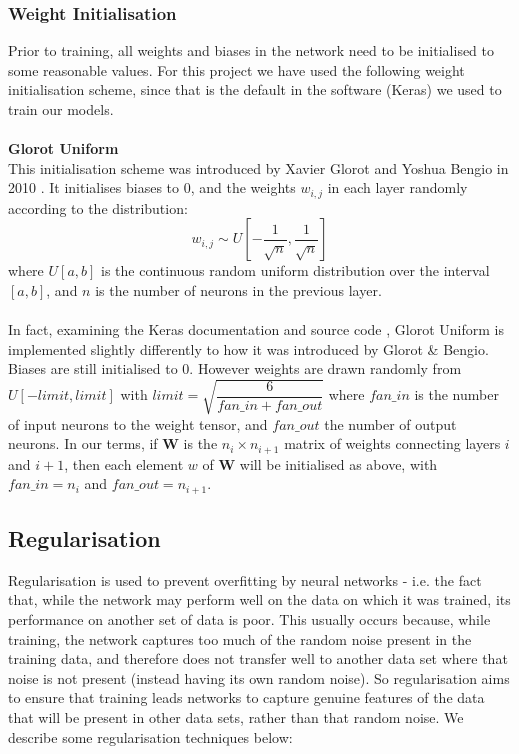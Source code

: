 \documentclass[11pt]{article} %
\theoremstyle{plain}
\theoremstyle{definition}
\begin{document}
\subsubsection{Weight Initialisation}
Prior to training, all weights and biases in the network need to be initialised to some reasonable values. For this project we have used the following weight initialisation scheme, since that is the default in the software (Keras) we used to train our models.
\\
\\
\noindent
\textbf{Glorot Uniform}
\\
\noindent
This initialisation scheme was introduced by Xavier Glorot and Yoshua Bengio in 2010 \cite{glorot_uniform}. It initialises biases to 0, and the weights \(w_{i,j}\) in each layer randomly according to the distribution:
\[ w_{i,j} \sim U[-\dfrac{1}{\sqrt{n}}, \dfrac{1}{\sqrt{n}}] \]
where \(U[a,b]\) is the continuous random uniform distribution over the interval \([a,b]\), and \(n\) is the number of neurons in the previous layer.
\\
\\
\noindent
In fact, examining the Keras documentation and source code \cite{keras_source_glorot_uniform}, Glorot Uniform is implemented slightly differently to how it was introduced by Glorot \& Bengio. Biases are still initialised to 0. However weights are drawn randomly from \(U[-limit,limit]\) with \(limit = \sqrt{\dfrac{6}{fan\_in + fan\_out}}\) where \(fan\_in\) is the number of input neurons to the weight tensor, and \(fan\_out\) the number of output neurons. In our terms, if \(\mathbf{W}\) is the \(n_i \times n_{i+1}\) matrix of weights connecting layers \(i\) and \(i+1\), then each element \(w\) of \(\mathbf{W}\) will be initialised as above, with \(fan\_in = n_i\) and \(fan\_out = n_{i+1}\).  


\subsection{Regularisation}
Regularisation is used to prevent overfitting by neural networks - i.e. the fact that, while the network may perform well on the data on which it was trained, its performance on another set of data is poor. This usually occurs because, while training, the network captures too much of the random noise present in the training data, and therefore does not transfer well to another data set where that noise is not present (instead having its own random noise). So regularisation aims to ensure that training leads networks to capture genuine features of the data that will be present in other data sets, rather than that random noise. We describe some regularisation techniques below: 
\end{document}
